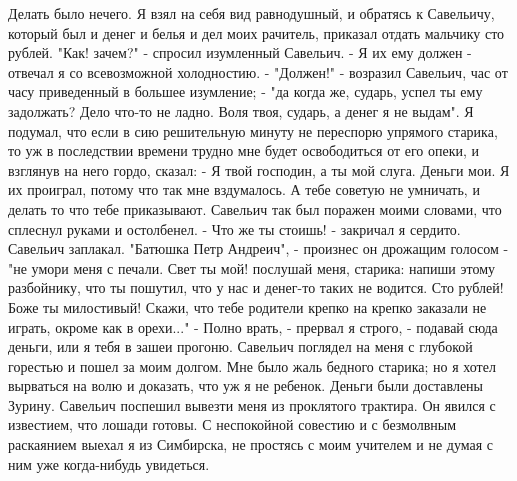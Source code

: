 Делать  было  нечего.  Я взял  на  себя  вид равнодушный, и обратясь  к
Савельичу, который был и денег и белья и дел моих  рачитель, приказал отдать
мальчику сто рублей. "Как! зачем?" - спросил изумленный Савельич. - Я их ему
должен -  отвечал я  со всевозможной  холодностию. -  "Должен!"  -  возразил
Савельич,  час от часу  приведенный в большее  изумление; -  "да  когда  же,
сударь,  успел ты ему задолжать? Дело  что-то не ладно. Воля твоя, сударь, а
денег я не выдам".
Я подумал, что если  в сию  решительную  минуту  не переспорю  упрямого
старика, то уж в последствии времени  трудно мне будет  освободиться от  его
опеки, и взглянув на него гордо, сказал: -  Я твой господин, а ты мой слуга.
Деньги мои. Я их проиграл, потому что так мне вздумалось. А тебе  советую не
умничать, и делать то что тебе приказывают.
Савельич  так  был  поражен  моими  словами,  что   сплеснул  руками  и
остолбенел. -  Что же ты стоишь!  -  закричал я  сердито. Савельич заплакал.
"Батюшка Петр Андреич",  - произнес он дрожащим голосом -  "не  умори меня с
печали. Свет ты мой! послушай меня, старика: напиши этому разбойнику, что ты
пошутил, что  у  нас и  денег-то  таких  не  водится.  Сто рублей!  Боже  ты
милостивый!  Скажи,  что тебе родители крепко  на крепко заказали не играть,
окроме как  в  орехи..." - Полно  врать, -  прервал я строго, - подавай сюда
деньги, или я тебя в зашеи прогоню.
Савельич поглядел на меня с глубокой горестью и пошел за  моим  долгом.
Мне было жаль бедного старика;  но я хотел вырваться на волю и доказать, что
уж я  не ребенок. Деньги  были доставлены  Зурину. Савельич поспешил вывезти
меня  из проклятого трактира. Он явился  с  известием, что лошади  готовы. С
неспокойной  совестию  и с  безмолвным раскаянием выехал  я из Симбирска, не
простясь с моим учителем и не думая с ним уже когда-нибудь увидеться.

